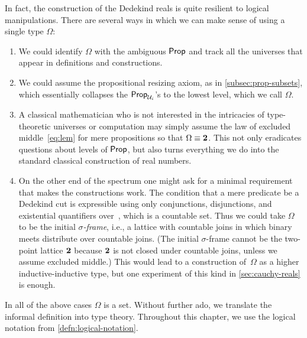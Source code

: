 In fact, the construction of the Dedekind reals is quite resilient to logical
manipulations. There are several ways in which we can make sense of using a single type
$\Omega$:
%
\begin{enumerate}

\item We could identify $\Omega$ with the ambiguous $\mathsf{Prop}$ and track all the universes
  that appear in definitions and constructions.

\item We could assume the propositional resizing axiom,
  as in \cref{subsec:prop-subsets}, which essentially collapses the $\mathsf{Prop}_{\mathcal{U}_i}$'s to the
  lowest level, which we call $\Omega$.

\item A classical mathematician who is not interested in the intricacies of type-theoretic
  universes or computation may simply assume the law of excluded middle~\eqref{eq:lem} for
  mere propositions so that $\Omega \equiv \mathbf{2}$.
  This not only eradicates questions about
  levels of $\mathsf{Prop}$, but also turns everything we do into the standard classical
  construction of real numbers.

\item On the other end of the spectrum one might ask for a minimal requirement that makes
  the constructions work. The condition that a mere predicate be a Dedekind cut is
  expressible using only conjunctions, disjunctions, and existential quantifiers over~\Q, which
  is a countable set. Thus we could take $\Omega$ to be the initial \emph{$\sigma$-frame},
  i.e., a lattice with countable joins in which binary meets distribute over countable
  joins. (The initial $\sigma$-frame cannot be the two-point lattice $\mathbf{2}$ because
  $\mathbf{2}$ is not closed under countable joins, unless we assume excluded middle.) This
  would lead to a construction of~$\Omega$ as a higher inductive-inductive type, but one
  experiment of this kind in \cref{sec:cauchy-reals} is enough.
\end{enumerate}

In all of the above cases $\Omega$ is a set.
%
Without further ado, we translate the informal definition into type theory.
Throughout this chapter, we use the
logical notation from \cref{defn:logical-notation}.

